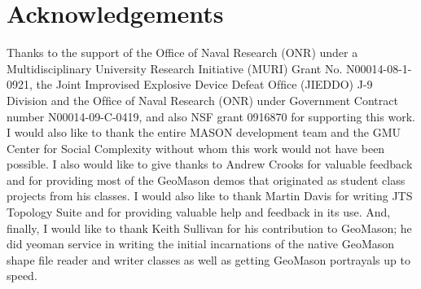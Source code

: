 \documentclass[twoside,10pt]{book}
\begin{document}
\chapter*{Acknowledgements} %
\thispagestyle{empty} %

Thanks to the support of the Office of Naval Research (ONR) under a
Multidisciplinary University Research Initiative (MURI) Grant
No. N00014-08-1-0921, the Joint Improvised Explosive Device Defeat
Ofﬁce (JIEDDO) J-9 Division and the Ofﬁce of Naval Research (ONR)
under Government Contract number N00014-09-C-0419, and also NSF grant
0916870 for supporting this work. I would also like to thank the
entire MASON development team and the GMU Center for Social Complexity
without whom this work would not have been possible.  I also would
like to give thanks to Andrew Crooks for valuable feedback and for
providing most of the GeoMason demos that originated as student class
projects from his classes.  I would also like to thank Martin Davis
for writing JTS Topology Suite and for providing valuable help and
feedback in its use.  And, finally, I would like to thank Keith
Sullivan for his contribution to GeoMason; he did yeoman service in
writing the initial incarnations of the native GeoMason shape file
reader and writer classes as well as getting GeoMason portrayals up to
speed.


\cleardoublepage
\footnotesize
{}
\printindex
\end{document}
